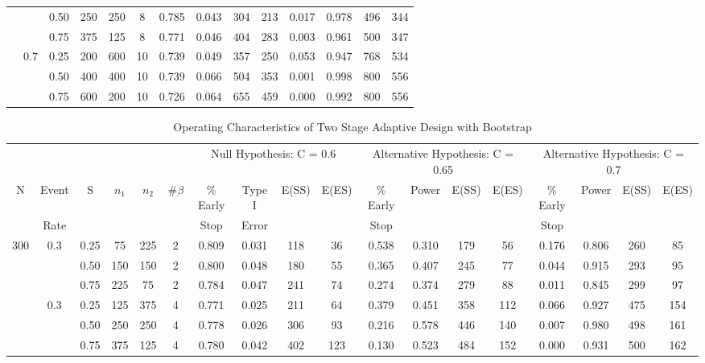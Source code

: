 \begin{table}
\begin{tabular}[t]{cccccccccccccc}
 &  & 0.50 & 250 & 250 & 8 & 0.785 & 0.043 & 304 & 213 & 0.017 & 0.978 & 496 & 344\\
 &  & 0.75 & 375 & 125 & 8 & 0.771 & 0.046 & 404 & 283 &  0.003 & 0.961 & 500 & 347\\
\addlinespace
800 & 0.7 & 0.25 & 200 & 600 & 10 & 0.739 & 0.049 & 357 & 250 &  0.053 & 0.947 & 768 & 534\\
 &  & 0.50 & 400 & 400 & 10 & 0.739 & 0.066 & 504 & 353 &  0.001 & 0.998 & 800 & 556\\
 &  & 0.75 & 600 & 200 & 10 & 0.726 & 0.064 & 655 & 459 &  0.000 & 0.992 & 800 & 556\\
\bottomrule
\end{tabular}
\end{table}

\begin{table}
\setlength{\tabcolsep}{2pt}
\caption{\label{tab:}Operating Characteristics of Two Stage Adaptive Design with Bootstrap}
\scriptsize
\centering
\begin{tabular}[t]{cccccccccccccccccc}
\toprule
 & & & & & & \multicolumn{4}{c}{Null Hypothesis: C = 0.6} & 
		\multicolumn{4}{c}{Alternative Hypothesis: C = 0.65} & 
		\multicolumn{4}{c}{Alternative Hypothesis: C = 0.7}\\ 
		\cmidrule(lr){7-10} 
		\cmidrule(lr){11-14}
		\cmidrule(lr){15-18}
N & Event & S & $n_1$ & $n_2$ & $\#\beta$ & $\%$Early & Type I & E(SS) & E(ES) & $\%$ Early& Power & E(SS) & E(ES)& $\%$ Early& Power & E(SS) & E(ES)\\
 & Rate& & & & & Stop & Error & & &Stop & & & & Stop & & &\\
\midrule
300 & 0.3 & 0.25 & 75 & 225 & 2 & 0.809 & 0.031 & 118 & 36 & 0.538 & 0.310 & 179 & 56 & 0.176 & 0.806 & 260 & 85\\
 &  & 0.50 & 150 & 150 & 2 & 0.800 & 0.048 & 180 & 55 & 0.365 & 0.407 & 245 & 77 & 0.044 & 0.915 & 293 & 95\\
 &  & 0.75 & 225 & 75 & 2 & 0.784 & 0.047 & 241 & 74 & 0.274 & 0.374 & 279 & 88 & 0.011 & 0.845 & 299 & 97\\
\addlinespace
500 & 0.3 & 0.25 & 125 & 375 & 4 & 0.771 & 0.025 & 211 & 64 & 0.379 & 0.451 & 358 & 112 & 0.066 & 0.927 & 475 & 154\\
 &  & 0.50 & 250 & 250 & 4 & 0.778 & 0.026 & 306 & 93 & 0.216 & 0.578 & 446 & 140 & 0.007 & 0.980 & 498 & 161\\
 &  & 0.75 & 375 & 125 & 4 & 0.780 & 0.042 & 402 & 123 & 0.130 & 0.523 & 484 & 152 & 0.000 & 0.931 & 500 & 162\\

\end{tabular}
\end{table}
